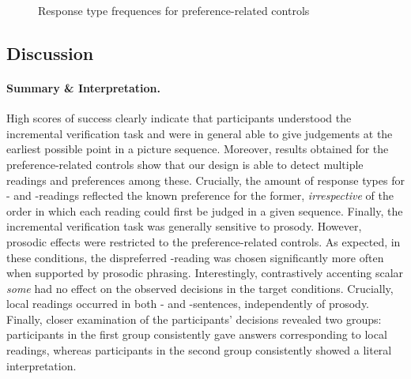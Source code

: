 \documentclass[fleqn,reqno,10pt,draft]{article}
\newcommand{\as}{\acro{as}}
\renewcommand{\es}{\acro{es}}
\newcommand{\lc}{\acro{lc}}
\newcommand{\ec}{\acro{ec}}
\begin{document}
\begin{figure}[t]
{
}
  \caption{Response type frequences for preference-related controls}
  \label{fig:response-type-freque-TRF}
\end{figure}


\subsection{Discussion}
\label{sec:discussion-1}

\paragraph{Summary \& Interpretation.} High scores of success clearly
indicate that participants understood the incremental verification
task and were in general able to give judgements at the earliest
possible point in a picture sequence.  Moreover, results obtained for
the preference-related controls show that our design is able to detect
multiple readings and preferences among these. Crucially, the amount
of response types for \lc- and \ec-readings reflected the known
preference for the former, \emph{irrespective} of the order in which
each reading could first be judged in a given sequence.  Finally, the
incremental verification task was generally sensitive to
prosody. However, prosodic effects were restricted to the
preference-related controls. As expected, in these conditions, the
dispreferred \ec-reading was chosen significantly more often when
supported by prosodic phrasing. Interestingly, contrastively accenting
scalar \emph{some} had no effect on the observed decisions in the
target conditions. Crucially, local readings occurred in both \as- and
\es-sentences, independently of prosody. Finally, closer examination
of the participants' decisions revealed two groups: participants in
the first group consistently gave answers corresponding to local
readings, whereas participants in the second group consistently showed
a literal interpretation.
\end{document}
